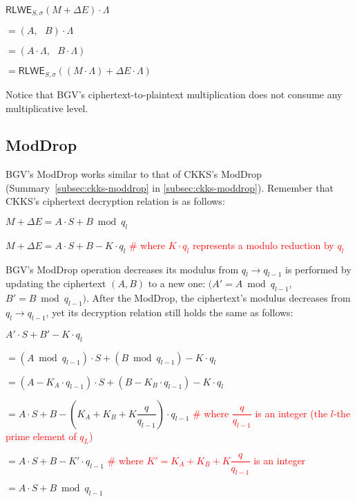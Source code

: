 \begin{tcolorbox}[title={\textbf{\tboxlabel{\ref*{subsec:bgv-mult-plain}} BGV Ciphertext-to-Plaintext Multiplication}}]
$\textsf{RLWE}_{S, \sigma}(M + \Delta E) \cdot \Lambda$

$= (A, \text{ } B) \cdot \Lambda$

$= (A \cdot \Lambda, \text{ }  B \cdot \Lambda )$

$= \textsf{RLWE}_{S, \sigma}((M \cdot \Lambda) + \Delta E\cdot \Lambda )$
\end{tcolorbox}

Notice that BGV's ciphertext-to-plaintext multiplication does not consume any multiplicative level. 

\subsection{\textsf{ModDrop}}
\label{subsec:bgv-moddrop}

BGV's \textsf{ModDrop} works similar to that of CKKS's \textsf{ModDrop} (Summary~\ref*{subsec:ckks-moddrop} in \autoref{subsec:ckks-moddrop}). Remember that CKKS's ciphertext decryption relation is as follows:

$M + \Delta E = A \cdot S + B \bmod q_l$

$M + \Delta E = A \cdot S + B - K\cdot q_l$ \textcolor{red}{ \# where $K\cdot q_l$ represents a modulo reduction by $q_l$}

BGV's \textsf{ModDrop} operation decreases its modulus from $q_l \rightarrow q_{l-1}$ is performed by updating the ciphertext $(A, B)$ to a new one: $\bm(A' = A \bmod q_{l-1}$, $B' = B \bmod q_{l-1})$. After the \textsf{ModDrop}, the ciphertext's modulus decreases from $q_l \rightarrow q_{l-1}$, yet its decryption relation still holds the same as follows:

$A' \cdot S + B' - K\cdot q_l $

$= (A \bmod q_{l-1}) \cdot S + (B \bmod q_{l-1}) - K\cdot q_l$

$= (A - K_A\cdot q_{l-1}) \cdot S + (B - K_B\cdot q_{l-1}) - K\cdot q_l$ 

$= A\cdot S + B - (K_A + K_B + K\dfrac{q}{q_{l-1}})\cdot q_{l-1}$
\textcolor{red}{ \# where $\dfrac{q}{q_{l-1}}$ is an integer (the $l$-the prime element of $q_L$)}

$= A\cdot S + B - K'\cdot q_{l-1}$ \textcolor{red}{ \# where $K' = K_A + K_B + K\dfrac{q}{q_{l-1}}$ is an integer}

$= A\cdot S + B \bmod q_{l-1}$

